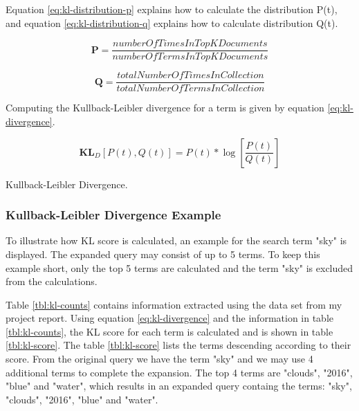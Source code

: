 Equation \ref{eq:kl-distribution-p} explains how to calculate the distribution P(t),
and equation \ref{eq:kl-distribution-q} explains how to calculate distribution Q(t).

\begin{cequation}[H]
	\begin{equation}
		\mathbf{P} = \frac{numberOfTimesInTopKDocuments}{numberOfTermsInTopKDocuments}
	\end{equation}
	\caption{}
  \label{eq:kl-distribution-p}
\end{cequation}

\begin{cequation}[H]
	\begin{equation}
		\mathbf{Q} = \frac{totalNumberOfTimesInCollection}{totalNumberOfTermsInCollection}
	\end{equation}
	\caption{}
  \label{eq:kl-distribution-q}
\end{cequation}

Computing the Kullback-Leibler divergence for a term is given by equation \ref{eq:kl-divergence}.

\begin{cequation}[H]
	\begin{equation}
		\mathbf{KL}_D[P(t), Q(t)] = P(t)*\log{[\frac{P(t)}{Q(t)}]}
	\end{equation}
	\caption{Kullback-Leibler Divergence.}
  \label{eq:kl-divergence}
\end{cequation}

\subsubsection{Kullback-Leibler Divergence Example}
To illustrate how KL score is calculated, an example for the search term "sky" is displayed.
The expanded query may consist of up to 5 terms.
To keep this example short, only the top 5 terms are calculated and the term "sky" is excluded from the calculations.

Table \ref{tbl:kl-counts} contains information extracted using the data set from my project report.
Using equation \ref{eq:kl-divergence} and the information in table \ref{tbl:kl-counts}, the KL score for each term is calculated and is shown in table \ref{tbl:kl-score}.
The table \ref{tbl:kl-score} lists the terms descending according to their score.
From the original query we have the term "sky" and we may use 4 additional terms to complete the expansion.
The top 4 terms are "clouds", "2016", "blue" and "water",
which results in an expanded query containg the terms: "sky", "clouds", "2016", "blue" and "water".


